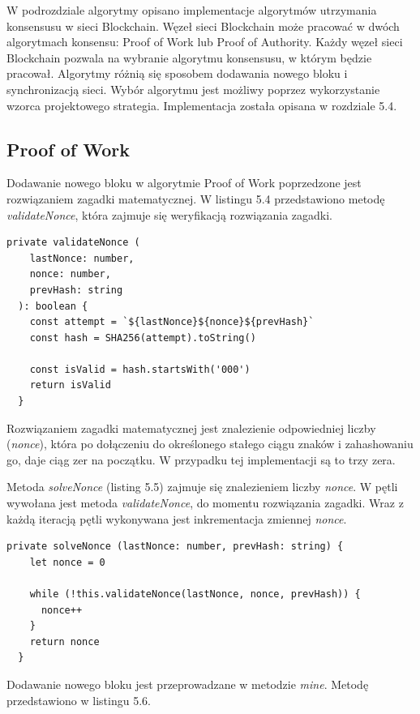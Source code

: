 \documentclass[a4paper,12pt]{book}
\begin{document}
W podrozdziale algorytmy opisano implementacje algorytmów utrzymania konsensusu w sieci Blockchain. Węzeł sieci Blockchain może pracować w dwóch algorytmach konsensu: Proof of Work lub Proof of Authority. Każdy węzeł sieci Blockchain pozwala na wybranie algorytmu konsensusu, w którym będzie pracował. Algorytmy różnią się sposobem dodawania nowego bloku i synchronizacją sieci. Wybór algorytmu jest możliwy poprzez wykorzystanie wzorca projektowego strategia. Implementacja została opisana w rozdziale 5.4.

\subsection{Proof of Work}

Dodawanie nowego bloku w algorytmie Proof of Work poprzedzone jest rozwiązaniem zagadki matematycznej. W listingu 5.4 przedstawiono metodę \textit{validateNonce}, która zajmuje się weryfikacją rozwiązania zagadki.

\begin{lstlisting}[style=ES6, caption={Metoda \textit{validateNonce}.}]
private validateNonce (
    lastNonce: number,
    nonce: number,
    prevHash: string
  ): boolean {
    const attempt = `${lastNonce}${nonce}${prevHash}`
    const hash = SHA256(attempt).toString()

    const isValid = hash.startsWith('000')
    return isValid
  }
\end{lstlisting}

Rozwiązaniem zagadki matematycznej jest znalezienie odpowiedniej liczby (\textit{nonce}), która po dołączeniu do określonego stałego ciągu znaków i zahashowaniu go, daje ciąg zer na początku. W przypadku tej implementacji są to trzy zera.

Metoda \textit{solveNonce} (listing 5.5) zajmuje się znalezieniem liczby \textit{nonce}. W pętli wywołana jest metoda \textit{validateNonce}, do momentu rozwiązania zagadki. Wraz z każdą iteracją pętli wykonywana jest inkrementacja zmiennej \textit{nonce}.

\begin{lstlisting}[style=ES6, caption={Metoda \textit{solveNonce}.}]
private solveNonce (lastNonce: number, prevHash: string) {
    let nonce = 0

    while (!this.validateNonce(lastNonce, nonce, prevHash)) {
      nonce++
    }
    return nonce
  }
\end{lstlisting}

Dodawanie nowego bloku jest przeprowadzane w metodzie \textit{mine}. Metodę przedstawiono w listingu 5.6.
\end{document}
